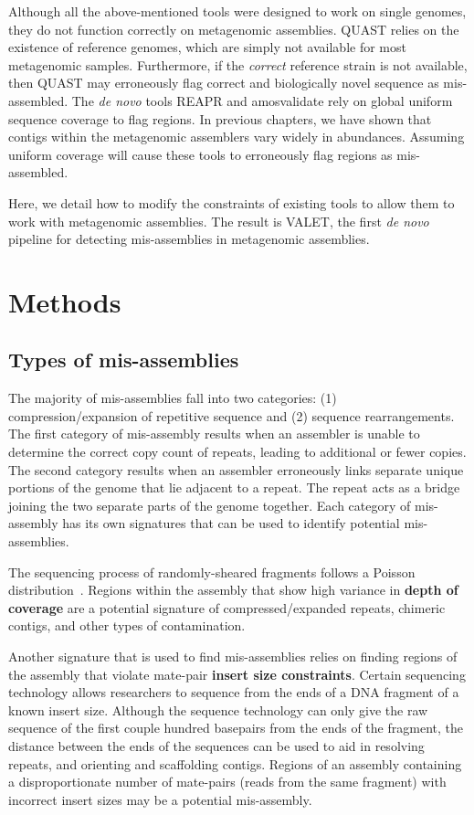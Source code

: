 \documentclass{bioinfo}
\begin{document}
Although all the above-mentioned tools were designed to work on single genomes, they do not function correctly on metagenomic assemblies.
QUAST relies on the existence of reference genomes, which are simply not available for most metagenomic samples.
Furthermore, if the \emph{correct} reference strain is not available, then QUAST may erroneously flag correct and biologically novel sequence as mis-assembled.
The \emph{de novo} tools REAPR and amosvalidate rely on global uniform sequence coverage to flag regions.
In previous chapters, we have shown that contigs within the metagenomic assemblers vary widely in abundances.
Assuming uniform coverage will cause these tools to erroneously flag regions as mis-assembled.

Here, we detail how to modify the constraints of existing tools to allow them to work with metagenomic assemblies.
The result is VALET, the first \emph{de novo} pipeline for detecting mis-assemblies in metagenomic assemblies.

\section{Methods}

\subsection{Types of mis-assemblies}

The majority of mis-assemblies fall into two categories: (1) compression/expansion of repetitive sequence and (2) sequence rearrangements.
The first category of mis-assembly results when an assembler is unable to determine the correct copy count of repeats, leading to additional or fewer copies.
The second category results when an assembler erroneously links separate unique portions of the genome that lie adjacent to a repeat.
The repeat acts as a bridge joining the two separate parts of the genome together.
Each category of mis-assembly has its own signatures that can be used to identify potential mis-assemblies.

The sequencing process of randomly-sheared fragments follows a Poisson distribution~\citep{lander1988genomic}.
Regions within the assembly that show high variance in \textbf{depth of coverage} are a potential signature of compressed/expanded repeats, chimeric contigs, and other types of contamination.

Another signature that is used to find mis-assemblies relies on finding regions of the assembly that violate mate-pair \textbf{insert size constraints}.
Certain sequencing technology allows researchers to sequence from the ends of a DNA fragment of a known insert size.
Although the sequence technology can only give the raw sequence of the first couple hundred basepairs from the ends of the fragment, the distance between the ends of the sequences can be used to aid in resolving repeats, and orienting and scaffolding contigs.
Regions of an assembly containing a disproportionate number of mate-pairs (reads from the same fragment) with incorrect insert sizes may be a potential mis-assembly.
\end{document}
